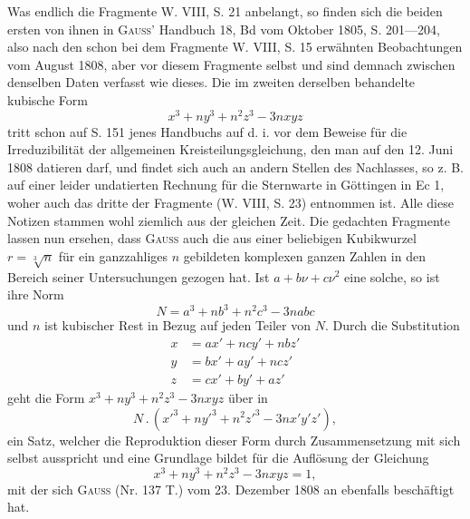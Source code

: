 Was endlich die Fragmente W. VIII, S. 21 anbelangt, so finden sich die beiden ersten von ihnen in \textsc{Gauss}’ Handbuch 18, Bd vom Oktober 1805, S. 201—204, also nach den schon bei dem Fragmente W. VIII, S. 15 erwähnten Beobachtungen vom August 1808, aber vor diesem Fragmente selbst und sind demnach zwischen denselben Daten verfasst wie dieses. Die im zweiten derselben behandelte kubische Form
\[
x^3+ny^3+n^2z^3-3nxyz
\]
tritt schon auf S. 151 jenes Handbuchs auf d. i. vor dem Beweise für die Irreduzibilität der allgemeinen Kreisteilungsgleichung, den man auf den 12. Juni 1808 datieren darf, und findet sich auch an andern Stellen des Nachlasses, so z. B. auf einer leider undatierten Rechnung für die Sternwarte in Göttingen in Ec 1, woher auch das dritte der Fragmente (W. VIII, S. 23)
\newpage{}
\noindent entnommen ist. Alle diese Notizen stammen wohl ziemlich aus der gleichen Zeit. Die gedachten Fragmente lassen nun ersehen, dass \textsc{Gauss} auch die aus einer beliebigen Kubikwurzel \(r=\sqrt[3]{n}\) für ein ganzzahliges \(n\) gebildeten komplexen ganzen Zahlen in den Bereich seiner Untersuchungen gezogen hat. Ist \(a+b\nu+c\nu^2\) eine solche, so ist ihre Norm
\[
N=a^3+nb^3+n^2c^3-3nabc
\]
und \(n\) ist kubischer Rest in Bezug auf jeden Teiler von \(N\). Durch die Substitution
\[
\begin{aligned}
x&=ax'+ncy'+nbz'\\
y&=bx'+ay'+ncz'\\
z&=cx'+by'+az'
\end{aligned}
\]
geht die Form \(x^3+ny^3+n^2z^3-3nxyz\) über in
\[
N\mathbin{.}(x'^3+ny'^3+n^2z'^3-3nx'y'z'),
\]
ein Satz, welcher die Reproduktion dieser Form durch Zusammensetzung mit sich selbst ausspricht und eine Grundlage bildet für die Auflösung der Gleichung
\[
x^3+ny^3+n^2z^3-3nxyz=1,
\]
mit der sich \textsc{Gauss} (Nr. 137 T.) vom 23. Dezember 1808 an ebenfalls beschäftigt hat.
